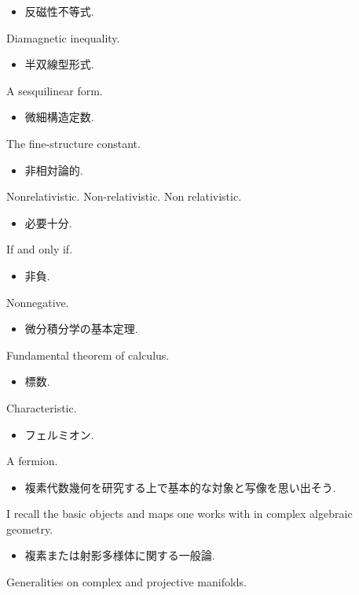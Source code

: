 \documentclass[openany, a4paper, oneside]{jsbook}
\begin{document}
\begin{itemize}
\item 反磁性不等式. \cite{LiebSeiringer1}
\end{itemize}
Diamagnetic inequality.

\begin{itemize}
\item 半双線型形式.
\end{itemize}
A sesquilinear form.

\begin{itemize}
\item 微細構造定数. \cite{LiebSeiringer1}
\end{itemize}
The fine-structure constant.

\begin{itemize}
\item 非相対論的.
\end{itemize}
Nonrelativistic. Non-relativistic. Non relativistic.

\begin{itemize}
\item 必要十分.
\end{itemize}
If and only if.

\begin{itemize}
\item 非負.
\end{itemize}
Nonnegative.

\begin{itemize}
\item 微分積分学の基本定理.
\end{itemize}
Fundamental theorem of calculus.

\begin{itemize}
\item 標数.
\end{itemize}
Characteristic.

\begin{itemize}
\item フェルミオン. \cite{LiebSeiringer1}
\end{itemize}
A fermion.

\begin{itemize}
\item 複素代数幾何を研究する上で基本的な対象と写像を思い出そう. \cite{ChrisPeters1}
\end{itemize}
I recall the basic objects and maps one works with in complex algebraic geometry.

\begin{itemize}
\item 複素または射影多様体に関する一般論. \cite{ChrisPeters1}
\end{itemize}
Generalities on complex and projective manifolds.
\end{document}
